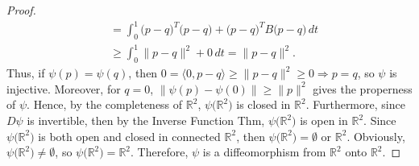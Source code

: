 \begin{proof}
\begin{align*}
    &= \int_0^1\big(p - q\big)^T\big(p - q\big) + \big(p - q\big)^T B\big(p - q\big)\,dt\\
    &\ge\int_0^1\|p - q\|^2+0\,dt = \|p - q\|^2.
\end{align*}
Thus, if $\psi(p) = \psi(q)$, then $0 = \langle 0, p - q\rangle\ge\|p - q\|^2\ge 0 \Rightarrow p = q$, so $\psi$ is injective. Moreover, for $q = 0$, $\|\psi(p) - \psi(0)\|\ge\|p\|^2$ gives the properness of $\psi$. Hence, by the completeness of $\mathbb{R}^2$, $\psi\big(\mathbb{R}^2\big)$ is closed in $\mathbb{R}^2$. Furthermore, since $D\psi$ is invertible, then by the Inverse Function Thm, $\psi\big(\mathbb{R}^2\big)$ is open in $\mathbb{R}^2$. Since $\psi\big(\mathbb{R}^2\big)$ is both open and closed in connected $\mathbb{R}^2$, then $\psi\big(\mathbb{R}^2\big) = \emptyset$ or $\mathbb{R}^2$. Obviously, $\psi\big(\mathbb{R}^2\big)\neq\emptyset$, so $\psi\big(\mathbb{R}^2\big) = \mathbb{R}^2$. Therefore, $\psi$ is a diffeomorphism from $\mathbb{R}^2$ onto $\mathbb{R}^2$.


\end{proof}

